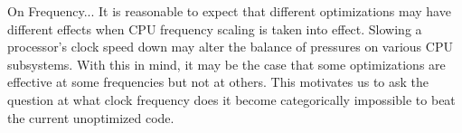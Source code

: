 

On Frequency...
It is reasonable to expect that different optimizations may have different effects when CPU frequency scaling is taken into effect. Slowing a processor's clock speed down may alter the balance of pressures on various CPU subsystems. With this in mind, it may be the case that some optimizations are effective at some frequencies but not at others. This motivates us to ask the question at what clock frequency does it become categorically impossible to beat the current unoptimized code.
